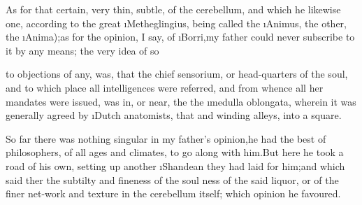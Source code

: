 \documentclass[twoside]{article}
\begin{document}
As for that certain, very thin, subtle, 
of the cerebellum, and which he likewise
one, according to the great \i{Metheglingius},
being called the \i{Animus}, the other, the
\i{Anima});\tsk as for the opinion, I say, of
\i{Borri},\tsk my father could never subscribe to it by any
means; the very idea of so 

\noindent
{}
to objections of any, was, that the chief
sensorium, or
head-quarters of the soul, and to which place all intelligences
were referred, and from whence all her mandates were issued,\tsk
was in, or near, the\break
{}
the \i{medulla oblongata}, wherein it was ge\-nerally agreed
by \i{Dutch} anatomists, that
 and
winding alleys, into a square.

So far there was nothing singular in my father’s
opinion,\tsk he had the best of philosophers, of all ages and
climates, to go along with him.\tsk But here he took a\break
road of his own, setting up another \i{Shan\-dean}  they had laid for him;\tsk and which
said 
ther the subtilty and
fineness of the soul 
ness of
the said liquor, or of the finer net-work and texture in the
cerebellum itself; which opinion he favoured.
\end{document}
